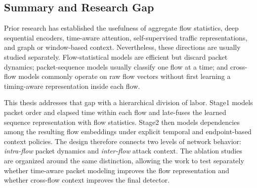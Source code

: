 \subsection{Summary and Research Gap}
\label{subsec:rw_gap}

Prior research has established the usefulness of aggregate flow statistics,
deep sequential encoders, time-aware attention, self-supervised traffic
representations, and graph or window-based context. Nevertheless, these
directions are usually studied separately. Flow-statistical models are
efficient but discard packet dynamics; packet-sequence models usually classify
one flow at a time; and cross-flow models commonly operate on raw flow vectors
without first learning a timing-aware representation inside each flow.

This thesis addresses that gap with a hierarchical division of labor. Stage1
models packet order and elapsed time within each flow and late-fuses the learned
sequence representation with flow statistics. Stage2 then models dependencies
among the resulting flow embeddings under explicit temporal and endpoint-based
context policies. The design therefore connects two levels of network behavior:
\emph{intra-flow} packet dynamics and \emph{inter-flow} attack context. The
ablation studies are organized around the same distinction, allowing the work
to test separately whether time-aware packet modeling improves the flow
representation and whether cross-flow context improves the final detector.

